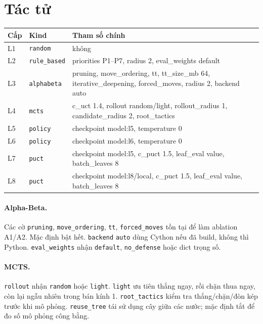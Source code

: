 \section{Tác tử}
\begin{center}\small
\begin{tabularx}{\textwidth}{@{}l l X@{}}
\toprule
\textbf{Cấp} & \textbf{Kind} & \textbf{Tham số chính} \\
\midrule
L1 & \texttt{random} & không \\
L2 & \texttt{rule\_based} & priorities P1--P7, radius 2, eval\_weights default \\
L3 & \texttt{alphabeta} & pruning, move\_ordering, tt, tt\_size\_mb 64, iterative\_deepening, forced\_moves, radius 2, backend auto \\
L4 & \texttt{mcts} & c\_uct 1.4, rollout random/light, rollout\_radius 1, candidate\_radius 2, root\_tactics \\
L5 & \texttt{policy} & checkpoint model:l5, temperature 0 \\
L6 & \texttt{policy} & checkpoint model:l6, temperature 0 \\
L7 & \texttt{puct} & checkpoint model:l5, c\_puct 1.5, leaf\_eval value, batch\_leaves 8 \\
L8 & \texttt{puct} & checkpoint model:l8/local, c\_puct 1.5, leaf\_eval value, batch\_leaves 8 \\
\bottomrule
\end{tabularx}
\end{center}

\paragraph{Alpha-Beta.} Các cờ \texttt{pruning}, \texttt{move\_ordering}, \texttt{tt},
\texttt{forced\_moves} tồn tại để làm ablation A1/A2. Mặc định bật hết. \texttt{backend}
\texttt{auto} dùng Cython nếu đã build, không thì Python. \texttt{eval\_weights} nhận
\texttt{default}, \texttt{no\_defense} hoặc dict trọng số.

\paragraph{MCTS.} \texttt{rollout} nhận \texttt{random} hoặc \texttt{light}. \texttt{light}
ưu tiên thắng ngay, rồi chặn thua ngay, còn lại ngẫu nhiên trong bán kính 1. \texttt{root\_tactics}
kiểm tra thắng/chặn/đòn kép trước khi mô phỏng. \texttt{reuse\_tree} tái sử dụng cây giữa các
nước; mặc định tắt để đo số mô phỏng công bằng.

